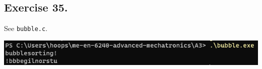 \documentclass[12pt]{article}
\begin{document}
\subsection*{Exercise 35.}
See \verb|bubble.c|.

\vspace{.1in}
\begin{center}
    \includegraphics{bubble_sort_img.png}
\end{center}
\end{document}
